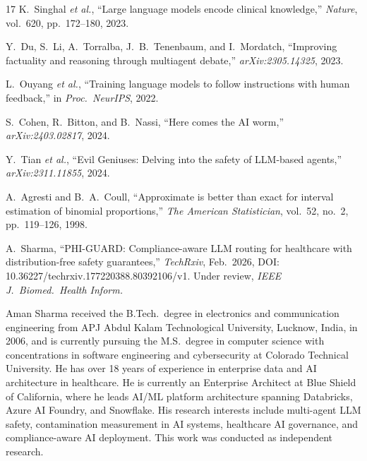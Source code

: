 \documentclass{ieeeaccess}
\begin{document}
\begin{thebibliography}{17}
 K.~Singhal \emph{et al.}, ``Large language models encode clinical knowledge,'' \emph{Nature}, vol.~620, pp.~172--180, 2023.

 Y.~Du, S.~Li, A.~Torralba, J.~B.~Tenenbaum, and I.~Mordatch, ``Improving factuality and reasoning through multiagent debate,'' \emph{arXiv:2305.14325}, 2023.

 L.~Ouyang \emph{et al.}, ``Training language models to follow instructions with human feedback,'' in \emph{Proc.\ NeurIPS}, 2022.

 S.~Cohen, R.~Bitton, and B.~Nassi, ``Here comes the AI worm,'' \emph{arXiv:2403.02817}, 2024.

 Y.~Tian \emph{et al.}, ``Evil Geniuses: Delving into the safety of LLM-based agents,'' \emph{arXiv:2311.11855}, 2024.

 A.~Agresti and B.~A.~Coull, ``Approximate is better than exact for interval estimation of binomial proportions,'' \emph{The American Statistician}, vol.~52, no.~2, pp.~119--126, 1998.

 A.~Sharma, ``PHI-GUARD: Compliance-aware LLM routing for healthcare with distribution-free safety guarantees,'' \emph{TechRxiv}, Feb.\ 2026, DOI: 10.36227/techrxiv.177220388.80392106/v1. Under review, \emph{IEEE J.\ Biomed.\ Health Inform.}

\end{thebibliography}

\begin{IEEEbiographynophoto}{Aman Sharma}
received the B.Tech.\ degree in electronics and communication
engineering from APJ Abdul Kalam Technological University,
Lucknow, India, in 2006, and is currently pursuing the M.S.\
degree in computer science with concentrations in software
engineering and cybersecurity at Colorado Technical University.
He has over 18 years of experience in enterprise data and AI
architecture in healthcare. He is currently an Enterprise
Architect at Blue Shield of California, where he leads AI/ML
platform architecture spanning Databricks, Azure AI Foundry,
and Snowflake. His research interests include multi-agent LLM
safety, contamination measurement in AI systems, healthcare AI
governance, and compliance-aware AI deployment. This work was
conducted as independent research.
\end{IEEEbiographynophoto}

\EOD
\end{document}
